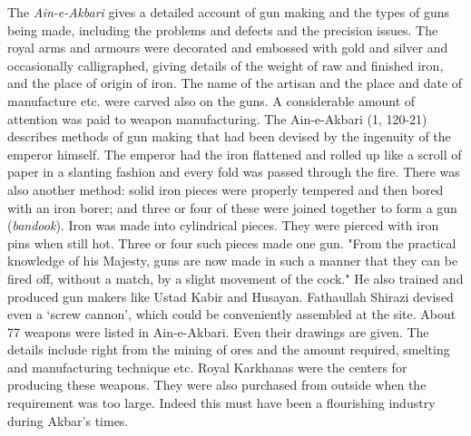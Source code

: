 The {\it Ain-e-Akbari} gives a detailed account of gun making and the types of guns being made, including the problems and defects and the precision issues. The royal arms and armours were decorated and embossed with gold and silver and occasionally calligraphed, giving details of the weight of raw and finished iron, and the place of origin of iron. The name of the artisan and the place and date of manufacture etc. were carved also on the guns. A considerable amount of attention was paid to weapon manufacturing. The Ain-e-Akbari (1, 120-21) describes methods of gun making that had been devised by the ingenuity of the emperor himself. The emperor had the iron flattened and rolled up like a scroll of paper in a slanting fashion and every fold was passed through the fire. There was also another method: solid iron pieces were properly tempered and then bored with an iron borer; and three or four of these were joined together to form a gun ({\it bandook}). Iron was made into cylindrical pieces. They were pierced with iron pins when still hot. Three or four such pieces made one gun. "From the practical knowledge of his Majesty, guns are now made in such a manner that they can be fired off, without a match, by a slight movement of the cock." He also trained and produced gun makers like Ustad Kabir and Husayan. Fathaullah Shirazi devised even a ‘screw cannon’, which could be conveniently assembled at the site. About 77 weapons were listed in Ain-e-Akbari. Even their drawings are given. The details include right from the mining of ores and the amount required, smelting and manufacturing technique etc. Royal Karkhanas were the centers for producing these weapons. They were also purchased from outside when the requirement was too large. Indeed this must have been a flourishing industry during Akbar’s times.

